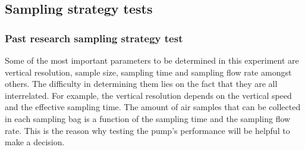 \begin{table}[H]

\noindent{}

\caption{Pump Flowrate/Efficiency according to the Datasheet and Tests}
\label{tab:pump-flowrate-efficiency}
\end{table}

\subsection{Sampling strategy tests}

\subsubsection{Past research sampling strategy test}
Some of the most important parameters to be determined in this experiment are vertical resolution, sample size, sampling time and sampling flow rate amongst others. The difficulty in determining them lies on the fact that they are all interrelated. For example, the vertical resolution depends on the vertical speed and the effective sampling time. The amount of air samples that can be collected in each sampling bag is a function of the sampling time and the sampling flow rate. This is the reason why testing the pump's performance will be helpful to make a decision.

